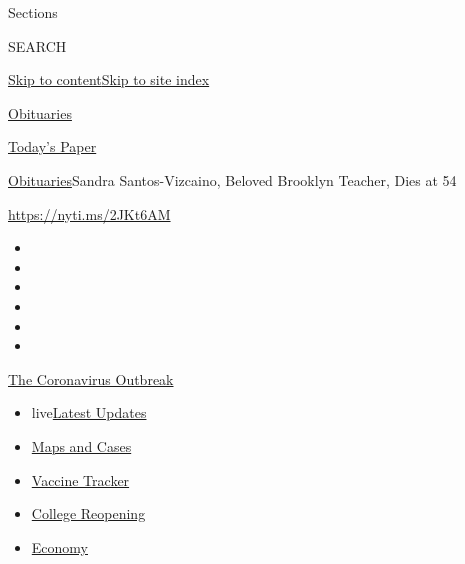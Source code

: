 Sections

SEARCH

\protect\hyperlink{site-content}{Skip to
content}\protect\hyperlink{site-index}{Skip to site index}

\href{https://www.nytimes3xbfgragh.onion/section/obituaries}{Obituaries}

\href{https://myaccount.nytimes3xbfgragh.onion/auth/login?response_type=cookie\&client_id=vi}{}

\href{https://www.nytimes3xbfgragh.onion/section/todayspaper}{Today's
Paper}

\href{/section/obituaries}{Obituaries}\textbar{}Sandra Santos-Vizcaino,
Beloved Brooklyn Teacher, Dies at 54

\url{https://nyti.ms/2JKt6AM}

\begin{itemize}
\item
\item
\item
\item
\item
\item
\end{itemize}

\href{https://www.nytimes3xbfgragh.onion/news-event/coronavirus?action=click\&pgtype=Article\&state=default\&region=TOP_BANNER\&context=storylines_menu}{The
Coronavirus Outbreak}

\begin{itemize}
\tightlist
\item
  live\href{https://www.nytimes3xbfgragh.onion/2020/08/04/world/coronavirus-covid-19.html?action=click\&pgtype=Article\&state=default\&region=TOP_BANNER\&context=storylines_menu}{Latest
  Updates}
\item
  \href{https://www.nytimes3xbfgragh.onion/interactive/2020/us/coronavirus-us-cases.html?action=click\&pgtype=Article\&state=default\&region=TOP_BANNER\&context=storylines_menu}{Maps
  and Cases}
\item
  \href{https://www.nytimes3xbfgragh.onion/interactive/2020/science/coronavirus-vaccine-tracker.html?action=click\&pgtype=Article\&state=default\&region=TOP_BANNER\&context=storylines_menu}{Vaccine
  Tracker}
\item
  \href{https://www.nytimes3xbfgragh.onion/2020/08/02/us/covid-college-reopening.html?action=click\&pgtype=Article\&state=default\&region=TOP_BANNER\&context=storylines_menu}{College
  Reopening}
\item
  \href{https://www.nytimes3xbfgragh.onion/live/2020/08/03/business/stock-market-today-coronavirus?action=click\&pgtype=Article\&state=default\&region=TOP_BANNER\&context=storylines_menu}{Economy}
\end{itemize}

